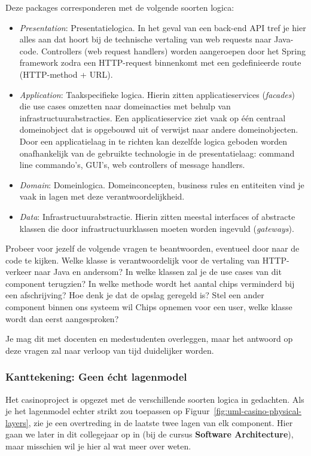 Deze packages corresponderen met de volgende soorten logica:
\begin{itemize}
    \item \emph{Presentation}: Presentatielogica. In het geval van een back-end API tref
    je hier alles aan dat hoort bij de technische vertaling van web requests naar Java-code. 
    Controllers (web request handlers) worden aangeroepen door het Spring framework 
    zodra een HTTP-request binnenkomt met een gedefinieerde route (HTTP-method + URL).
    \item \emph{Application}: Taakspecifieke logica. Hierin zitten applicatieservices (\emph{facades}) 
    die use cases omzetten naar domeinacties met behulp van infrastructuurabstracties. Een applicatieservice
    ziet vaak op één centraal domeinobject dat is opgebouwd uit of verwijst naar andere domeinobjecten.
    Door een applicatielaag in te richten kan dezelfde logica geboden worden onafhankelijk van de gebruikte 
    technologie in de presentatielaag: command line commando's, GUI's, web controllers of message handlers.
    \item \emph{Domain}: Domeinlogica. Domeinconcepten, business rules en entiteiten vind je vaak in lagen 
    met deze verantwoordelijkheid.
    \item \emph{Data}: Infrastructuurabstractie. Hierin zitten meestal interfaces of abstracte klassen die door
    infrastructuurklassen moeten worden ingevuld (\emph{gateways}).
\end{itemize}

Probeer voor jezelf de volgende vragen te beantwoorden, eventueel door naar de code te kijken.
Welke klasse is verantwoordelijk voor de vertaling van HTTP-verkeer naar Java en andersom?
In welke klassen zal je de use cases van dit component terugzien?
In welke methode wordt het aantal chips verminderd bij een afschrijving?
Hoe denk je dat de opslag geregeld is?
Stel een ander component binnen ons systeem wil Chips opnemen voor een user, welke klasse wordt dan 
eerst aangesproken?

Je mag dit met docenten en medestudenten overleggen, 
maar het antwoord op deze vragen zal naar verloop van tijd duidelijker worden.

\subsubsection*{Kanttekening: Geen écht lagenmodel}
Het casinoproject is opgezet met de verschillende soorten logica in gedachten. 
Als je het lagenmodel echter strikt zou toepassen op Figuur~\ref{fig:uml-casino-physical-layers}, 
zie je een overtreding in de laatste twee lagen van elk component. 
Hier gaan we later in dit collegejaar op in (bij de cursus \textbf{Software Architecture}),
maar misschien wil je hier al wat meer over weten.

